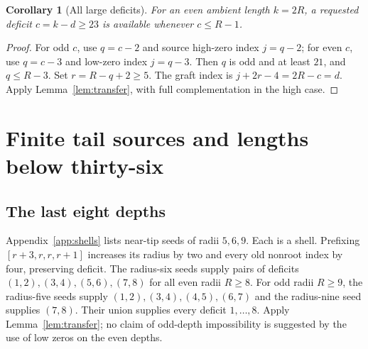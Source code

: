 \documentclass[11pt,a4paper]{article}
\newtheorem{corollary}[theorem]{Corollary}
\theoremstyle{definition}\newtheorem{definition}[theorem]{Definition}
\theoremstyle{remark}\newtheorem{remark}[theorem]{Remark}
\begin{document}
\begin{corollary}[All large deficits]\label{cor:deficits}
For an even ambient length $k=2R$, a requested deficit $c=k-d\ge23$
is available whenever $c\le R-1$.
\end{corollary}
\begin{proof}
For odd $c$, use $q=c-2$ and source high-zero index $j=q-2$;
for even $c$, use $q=c-3$ and low-zero index $j=q-3$.
Then $q$ is odd and at least $21$, and $q\le R-3$.
Set $r=R-q+2\ge5$. The graft index is
$j+2r-4=2R-c=d$. Apply Lemma~\ref{lem:transfer}, with full
complementation in the high case.
\end{proof}

\section{Finite tail sources and lengths below thirty-six}
\label{sec:finite}
\subsection{The last eight depths}
Appendix~\ref{app:shells} lists near-tip seeds of radii $5,6,9$.
Each is a shell. Prefixing $[r+3,r,r,r+1]$ increases its radius by two
and every old nonroot index by four, preserving deficit.
The radius-six seeds supply pairs of deficits $(1,2),(3,4),(5,6),(7,8)$
for all even radii $R\ge8$. For odd radii $R\ge9$, the radius-five
seeds supply $(1,2),(3,4),(4,5),(6,7)$ and the radius-nine seed supplies
$(7,8)$. Their union supplies every deficit $1,\ldots,8$.
Apply Lemma~\ref{lem:transfer}; no claim of odd-depth impossibility is
suggested by the use of low zeros on the even depths.
\end{document}
